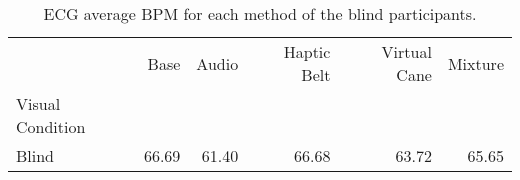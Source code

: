 
\begin{table}[!htb]
\centering
\caption{ECG average BPM  for each method of the blind participants.}
\label{tab:bpm_average_group_blind [BPM]}
\begin{tabular}{lrrrrr}
\toprule
{} &   Base &  Audio & Haptic Belt & Virtual Cane & Mixture \\
Visual Condition &        &        &             &              &         \\
\midrule
Blind            &  66.69 &  61.40 &       66.68 &        63.72 &   65.65 \\
\bottomrule
\end{tabular}
\end{table}

